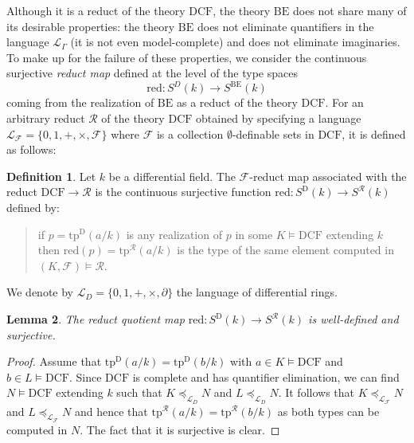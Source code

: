 \documentclass[12pt]{amsart}
\newcommand{\DCF}{\mathrm{DCF}}
\newcommand{\BE}{\mathrm{BE}}
\theoremstyle{definition}
\newtheorem{defn}{Definition}[section]
\theoremstyle{plain}
\newtheorem{lem}[defn]{Lemma}
\theoremstyle{exampstyle}\newtheorem{thmx}{Theorem}
\theoremstyle{exampstyle}\newtheorem{thmxbis}{Theorem}
\begin{document}
Although it is a reduct of the theory $\DCF$, the theory $\BE$ does not share many of its desirable properties: the theory $\BE$ does not eliminate quantifiers in the language $\mathcal L_\Gamma$ (it is not even model-complete) and does not eliminate imaginaries.  To make up for the failure of these properties, we consider the continuous surjective {\em reduct  map} defined at the level of the type spaces
\begin{equation}\label{equation-reductmap}
\mathrm{red}: S^D(k) \rightarrow S^{\mathrm{BE}}(k)
\end{equation}
 coming from the realization of $\BE$ as a reduct of the theory $\DCF$. For an arbitrary reduct $\mathcal R$ of the theory $\mathrm{DCF}$ obtained by specifying a language $\mathcal L_\mathcal F = \lbrace 0,1,+,\times, \mathcal F \rbrace$  where $\mathcal F$ is a collection $\emptyset$-definable sets in $\mathrm{DCF}$, it is defined as follows: 
\begin{defn} \label{definition-reducts}
Let $k$ be a differential field. The $\mathcal F$-reduct map associated with the reduct $\mathrm{DCF} \rightarrow \mathcal R$ is the continuous surjective function $\mathrm{red} : S^\mathrm{D}(k) \rightarrow S^{\mathcal R}(k)$ 
defined by:
\begin{quote} 
if $p = \mathrm{tp}^{\mathrm{D}}(a/k)$ is any realization of $p$ in some $K \models \mathrm{DCF}$ extending $k$ then $\mathrm{red}(p) = \mathrm{tp}^{\mathcal R}(a/k)$ is the type of the same element computed in $(K,\mathcal F) \models \mathcal R$.
\end{quote}  
\end{defn}

\noindent We denote by $\mathcal L_D = \lbrace 0,1,+,\times,\partial\rbrace$ the language of differential rings.

\begin{lem} 
The reduct quotient map  $\mathrm{red} : S^\mathrm{D}(k) \rightarrow S^{\mathcal R}(k)$  is well-defined and surjective. 
\end{lem} 

\begin{proof} 
Assume that $\mathrm{tp}^{\mathrm{D}}(a/k) = \mathrm{tp}^{\mathrm{D}}(b/k)$ with $a \in K \models \mathrm{DCF}$ and $b \in L \models \mathrm{DCF}$. Since $\mathrm{DCF}$ is complete and has quantifier elimination, we can find $N \models \mathrm{DCF}$ extending $k$ such that $K \preceq_{\mathcal L_D} N$ and $L \preceq_{\mathcal L_D} N$. It follows that $K \preceq_{\mathcal L_\mathcal F} N$ and $L \preceq_{\mathcal L_\mathcal F} N$ and hence that $\mathrm{tp}^{\mathcal{R}}(a/k) = \mathrm{tp}^{\mathcal{R}}(b/k)$ as both types can be computed in $N$. The fact that it is surjective is clear.
\end{proof}
\end{document}
